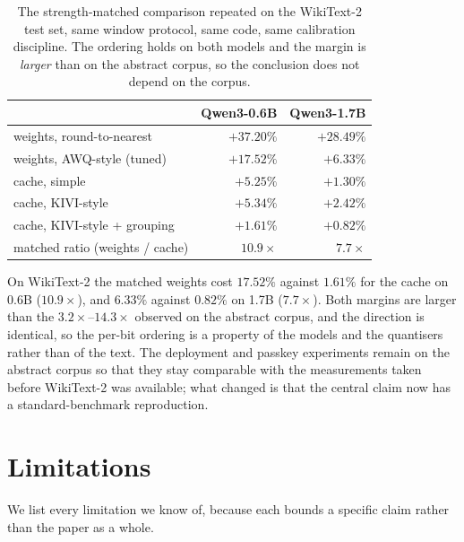 \documentclass[5p]{elsarticle}
\begin{document}
\begin{table}[t]
\centering
\caption{The strength-matched comparison repeated on the WikiText-2 test set, same
window protocol, same code, same calibration discipline. The ordering holds on both
models and the margin is \emph{larger} than on the abstract corpus, so the
conclusion does not depend on the corpus.}
\label{tab:wikitext}
\begin{tabular}{lrr}
\toprule
 & Qwen3-0.6B & Qwen3-1.7B \\
\midrule
weights, round-to-nearest & $+37.20\%$ & $+28.49\%$ \\
weights, AWQ-style (tuned) & $+17.52\%$ & $+6.33\%$ \\
cache, simple & $+5.25\%$ & $+1.30\%$ \\
cache, KIVI-style & $+5.34\%$ & $+2.42\%$ \\
cache, KIVI-style + grouping & $\mathbf{+1.61\%}$ & $\mathbf{+0.82\%}$ \\
\midrule
matched ratio (weights / cache) & $10.9\times$ & $7.7\times$ \\
\bottomrule
\end{tabular}
\end{table}

On WikiText-2 the matched weights cost $17.52\%$ against $1.61\%$ for the cache on
0.6B ($10.9\times$), and $6.33\%$ against $0.82\%$ on 1.7B ($7.7\times$). Both
margins are larger than the $3.2\times$--$14.3\times$ observed on the abstract
corpus, and the direction is identical, so the per-bit ordering is a property of
the models and the quantisers rather than of the text. The deployment and passkey
experiments remain on the abstract corpus so that they stay comparable with the
measurements taken before WikiText-2 was available; what changed is that the
central claim now has a standard-benchmark reproduction.

\section{Limitations}
\label{sec:limitations}

We list every limitation we know of, because each bounds a specific claim rather
than the paper as a whole.
\end{document}
